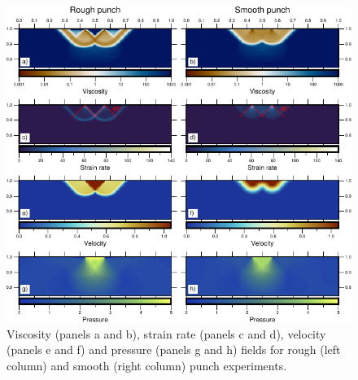 \begin{figure}[h!]
\centering
\includegraphics[width=14cm]{./Figures/Indenter.pdf}
\caption{Viscosity (panels a and b), strain rate (panels c and d), velocity (panels e and f) and pressure (panels g and h) fields for rough (left column) and
smooth (right column) punch experiments.}
\label{fig:indenter}
\end{figure}